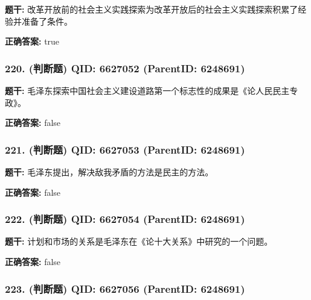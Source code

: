 \documentclass[12pt,UTF8]{ctexart}
\begin{document}
\textbf{题干:}
改革开放前的社会主义实践探索为改革开放后的社会主义实践探索积累了经验并准备了条件。



\textbf{正确答案:}
true

\vspace{0.3em}\hrulefill\vspace{0.7em}

\subsubsection*{220. (判断题) \small QID: 6627052 (ParentID: 6248691)}

\textbf{题干:}
毛泽东探索中国社会主义建设道路第一个标志性的成果是《论人民民主专政》。



\textbf{正确答案:}
false

\vspace{0.3em}\hrulefill\vspace{0.7em}

\subsubsection*{221. (判断题) \small QID: 6627053 (ParentID: 6248691)}

\textbf{题干:}
毛泽东提出，解决敌我矛盾的方法是民主的方法。



\textbf{正确答案:}
false

\vspace{0.3em}\hrulefill\vspace{0.7em}

\subsubsection*{222. (判断题) \small QID: 6627054 (ParentID: 6248691)}

\textbf{题干:}
计划和市场的关系是毛泽东在《论十大关系》中研究的一个问题。



\textbf{正确答案:}
false

\vspace{0.3em}\hrulefill\vspace{0.7em}

\subsubsection*{223. (判断题) \small QID: 6627056 (ParentID: 6248691)}
\end{document}

